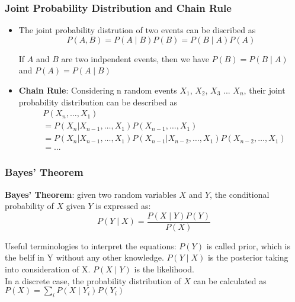 \documentclass[notheorems, aspectratio=54, tikz,border=10pt,multi]{beamer}
\def\parchmentframe#1{
\tikz{
  \node[inner sep=2em] (A) {#1};  %
  \begin{pgfonlayer}{background}  %
  \fill[normal border] 
        (A.south east) -- (A.south west) -- 
        (A.north west) -- (A.north east) -- cycle;
  \end{pgfonlayer}}}
\def\parchmentframetop#1{
\tikz{
  \node[inner sep=2em] (A) {#1};    %
  \begin{pgfonlayer}{background}    
  \fill[normal border]              %
        (A.south east) -- (A.south west) -- 
        (A.north west) -- (A.north east) -- cycle;
  \fill[torn border]                %
        ($(A.south east)-(0,.2)$) -- ($(A.south west)-(0,.2)$) -- 
        ($(A.south west)+(0,.2)$) -- ($(A.south east)+(0,.2)$) -- cycle;
  \end{pgfonlayer}}}
\def\parchmentframebottom#1{
\tikz{
  \node[inner sep=2em] (A) {#1};   %
  \begin{pgfonlayer}{background}   
  \fill[normal border]             %
        (A.south east) -- (A.south west) -- 
        (A.north west) -- (A.north east) -- cycle;
  \fill[torn border]               %
        ($(A.north east)-(0,.2)$) -- ($(A.north west)-(0,.2)$) -- 
        ($(A.north west)+(0,.2)$) -- ($(A.north east)+(0,.2)$) -- cycle;
  \end{pgfonlayer}}}
\def\parchmentframemiddle#1{
\tikz{
  \node[inner sep=2em] (A) {#1};   %
  \begin{pgfonlayer}{background}   
  \fill[normal border]             %
        (A.south east) -- (A.south west) -- 
        (A.north west) -- (A.north east) -- cycle;
  \fill[torn border]               %
        ($(A.south east)-(0,.2)$) -- ($(A.south west)-(0,.2)$) -- 
        ($(A.south west)+(0,.2)$) -- ($(A.south east)+(0,.2)$) -- cycle;
  \fill[torn border]               %
        ($(A.north east)-(0,.2)$) -- ($(A.north west)-(0,.2)$) -- 
        ($(A.north west)+(0,.2)$) -- ($(A.north east)+(0,.2)$) -- cycle;
  \end{pgfonlayer}}}
\newenvironment{parchment}[1][Example]{%
  \def\FrameCommand{\parchmentframe}%
  \def\FirstFrameCommand{\parchmentframetop}%
  \def\LastFrameCommand{\parchmentframebottom}%
  \def\MidFrameCommand{\parchmentframemiddle}%
  \vskip\baselineskip
  \MakeFramed {\FrameRestore}
  \noindent\tikz\node[inner sep=1ex, draw=black!20,fill=white, 
          anchor=west, overlay] at (0em, 2em) {\sffamily#1};\par}%
{\endMakeFramed}
\begin{document}
\begin{frame}

\frametitle{Joint Probability Distribution and Chain Rule}

\begin{itemize}
\item The joint probability distrution of two events can be discribed as $$P(A, B)=P(A\mid B)P(B)=P(B \mid A)P(A)$$

If $A$ and $B$ are two indpendent events, then we have $P(B)=P(B\mid A)$ and $P(A)=P(A\mid B)$

\vspace{0.5cm}

\item \textbf{Chain Rule}: Considering n random events $X_1$, $X_2$, $X_3$ ... $X_n$, their joint probability distribution can be described as
\begin{align*}
&P(X_n, \ldots, X_1)\\
&=P(X_{n}|X_{n-1},\ldots ,X_{1})P(X_{n-1},\ldots ,X_{1})\\
&=P(X_{n}|X_{n-1},\ldots ,X_{1})P(X_{n-1}|X_{n-2},\ldots ,X_{1})P(X_{n-2},\ldots ,X_{1})\\
&=...
\end{align*}
\end{itemize}
\end{frame}


\begin{frame}
\frametitle{Bayes' Theorem}
\textbf{Bayes' Theorem}: given two random variables $X$ and $Y$, the conditional probability of $X$ given $Y$ is expressed as:
$$P(Y\mid X)=\frac {P(X\mid Y)P(Y)}{P(X)}$$

Useful terminologies to interpret the equations: $P(Y)$ is called prior, which is the belif in Y without any other knowledge. $P(Y\mid X)$ is the posterior taking into consideration of X. $P(X\mid Y)$ is the likelihood.\\
\vspace{0.5cm}
In a discrete case, the probability distribution of $X$ can be calculated as
$P(X)=\sum _{i}P(X\mid Y_{i})P(Y_{i})$

\end{frame}


\end{document}
